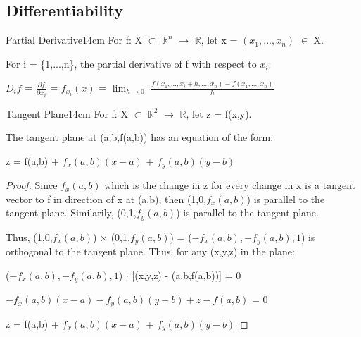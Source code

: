     \newpage





\subsection{ Differentiability }

    \begin{definition}{Partial Derivative}{14cm}
        For f: X $\subset$ $\mathbb{R}^n$ $\rightarrow$ $\mathbb{R}$,
        let x = $(x_1,...,x_n)$ $\in$ X.

        For i = \{1,...,n\}, the {\color{lblue} partial derivative} of f
        with respect to $x_i$:

        \hspace{0.5cm}
        $D_if$ = $\frac{\partial f}{\partial x_i}$ = $f_{x_i}(x)$
        = $\lim_{h \rightarrow 0}$
            $\frac{f(x_1,...,x_i+h,...,x_n) - f(x_1,...,x_n)}{h}$
    \end{definition}

    \vspace{0.5cm}



    \begin{wtheorem}{Tangent Plane}{14cm}
        For f: X $\subset$ $\mathbb{R}^2$ $\rightarrow$ $\mathbb{R}$,
        let z = f(x,y).
        
        The {\color{lblue} tangent plane} at (a,b,f(a,b))
        has an equation of the form:

        \hspace{0.5cm}
        z = f(a,b) + $f_x(a,b)(x-a)$ + $f_y(a,b)(y-b)$
    \end{wtheorem}

    \begin{proof}
        Since $f_x(a,b)$ which is the change in z for every change in x
        is a tangent vector to f in direction of x at (a,b), then
        (1,0,$f_x(a,b)$) is parallel to the tangent plane.
        Similarily, (0,1,$f_y(a,b)$) is parallel to the tangent plane.

        Thus, (1,0,$f_x(a,b)$) $\times$ (0,1,$f_y(a,b)$)
        = ($-f_x(a,b),-f_y(a,b),1$) is orthogonal to the tangent plane.
        Thus, for any (x,y,z) in the plane:

        \hspace{0.5cm}
        ($-f_x(a,b),-f_y(a,b),1$) $\cdot$ [(x,y,z) - (a,b,f(a,b))] = 0

        \hspace{0.5cm}
        $-f_x(a,b)(x-a) - f_y(a,b)(y-b) + z-f(a,b)$ = 0

        \hspace{0.5cm}
        z = f(a,b) + $f_x(a,b)(x-a)$ + $f_y(a,b)(y-b)$
    \end{proof}

